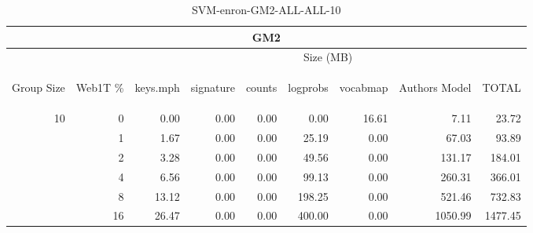 \begin{center}
\begin{table}[htbp] 
 \begin{center}
\begin{tabular}{ | r | r | r | r | r | r | r | r | r |}
\hline
\multicolumn{9}{|c|}{GM2}\\
\hline
 & & \multicolumn{7}{|c|}{Size (MB)}\\ \cline{3-9}
\begin{sideways}Group Size\end{sideways} & \begin{sideways}Web1T \% \end{sideways} & \begin{sideways}keys.mph\end{sideways} & \begin{sideways}signature\end{sideways} & \begin{sideways}counts\end{sideways} & \begin{sideways}logprobs\end{sideways} & \begin{sideways}vocabmap\end{sideways} & \begin{sideways}Authors Model \end{sideways} & \begin{sideways}TOTAL\end{sideways}\\
\hline
\multirow{5}{*}{10}
 & 0 & 0.00 & 0.00 & 0.00 & 0.00 & 16.61 & 7.11 & 23.72\\ \cline{2-9}
 & 1 & 1.67 & 0.00 & 0.00 & 25.19 & 0.00 & 67.03 & 93.89\\ \cline{2-9}
 & 2 & 3.28 & 0.00 & 0.00 & 49.56 & 0.00 & 131.17 & 184.01\\ \cline{2-9}
 & 4 & 6.56 & 0.00 & 0.00 & 99.13 & 0.00 & 260.31 & 366.01\\ \cline{2-9}
 & 8 & 13.12 & 0.00 & 0.00 & 198.25 & 0.00 & 521.46 & 732.83\\ \cline{2-9}
 & 16 & 26.47 & 0.00 & 0.00 & 400.00 & 0.00 & 1050.99 & 1477.45\\ \cline{2-9}
\hline
\end{tabular}
\caption{SVM-enron-GM2-ALL-ALL-10}
\label{table:SVM-enron-GM2-ALL-ALL-10}
\end{center}
 \end{table}
\end{center}

